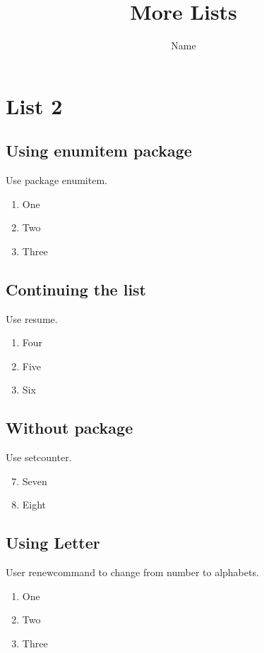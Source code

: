 \documentclass{proc}
\title{More Lists}
\author{Name}
\date{}
\begin{document}
\maketitle
\section{List 2}

\subsection{Using enumitem package}

Use package enumitem.

\begin{enumerate}
	\item One
	\item Two
	\item Three
\end{enumerate}

\subsection{Continuing the list}

Use resume.

\begin{enumerate}[resume]
	\item Four
	\item Five
	\item Six
\end{enumerate}

\subsection{Without package}

Use setcounter.

\begin{enumerate}
	\setcounter{enumi}{6}
	\item Seven
	\item Eight
\end{enumerate}

\subsection{Using Letter}

User renewcommand to change from number to alphabets.


\renewcommand{\theenumi}{\Alph{enumi}}
\begin{enumerate}
	\item One
	\item Two
	\item Three
\end{enumerate}
\end{document}

